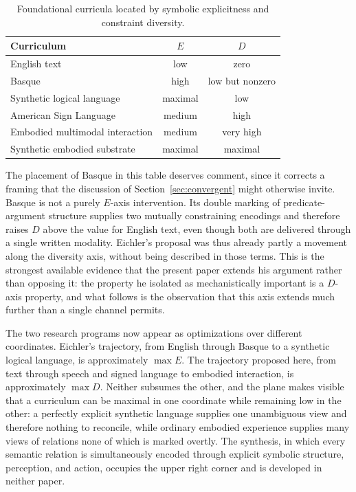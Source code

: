 \documentclass[11pt]{article}
\begin{document}
\begin{table}[h]
\centering
\begin{tabular}{lcc}
\hline
\textbf{Curriculum} & $E$ & $D$ \\
\hline
English text & low & zero \\
Basque & high & low but nonzero \\
Synthetic logical language & maximal & low \\
American Sign Language & medium & high \\
Embodied multimodal interaction & medium & very high \\
Synthetic embodied substrate & maximal & maximal \\
\hline
\end{tabular}
\caption{Foundational curricula located by symbolic explicitness and constraint diversity.}
\label{tab:ed-plane}
\end{table}

The placement of Basque in this table deserves comment, since it corrects a framing that the discussion of Section~\ref{sec:convergent} might otherwise invite. Basque is not a purely $E$-axis intervention. Its double marking of predicate-argument structure supplies two mutually constraining encodings and therefore raises $D$ above the value for English text, even though both are delivered through a single written modality. Eichler's proposal was thus already partly a movement along the diversity axis, without being described in those terms. This is the strongest available evidence that the present paper extends his argument rather than opposing it: the property he isolated as mechanistically important is a $D$-axis property, and what follows is the observation that this axis extends much further than a single channel permits.

The two research programs now appear as optimizations over different coordinates. Eichler's trajectory, from English through Basque to a synthetic logical language, is approximately $\max E$. The trajectory proposed here, from text through speech and signed language to embodied interaction, is approximately $\max D$. Neither subsumes the other, and the plane makes visible that a curriculum can be maximal in one coordinate while remaining low in the other: a perfectly explicit synthetic language supplies one unambiguous view and therefore nothing to reconcile, while ordinary embodied experience supplies many views of relations none of which is marked overtly. The synthesis, in which every semantic relation is simultaneously encoded through explicit symbolic structure, perception, and action, occupies the upper right corner and is developed in neither paper.
\end{document}
